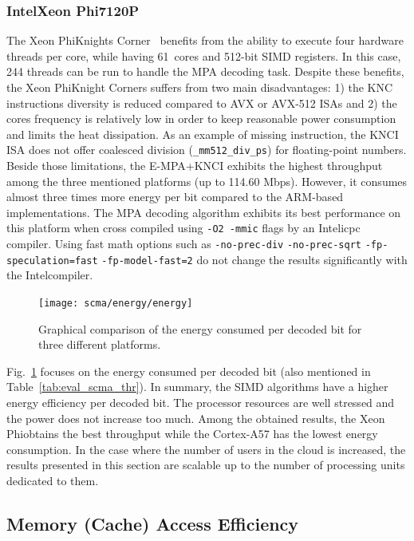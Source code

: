 \subsubsection{Intel\R Xeon Phi\TM 7120P}

The Xeon Phi\TM Knights Corner~\cite{Chrysos2012} benefits from the ability to
execute four hardware threads per core, while having 61~cores and 512-bit SIMD
registers. In this case, 244 threads can be run to handle the MPA decoding task.
Despite these benefits, the Xeon Phi\TM Knight Corners suffers from two main
disadvantages: 1) the KNC instructions diversity is reduced compared to AVX or
AVX-512 ISAs and 2) the cores frequency is relatively low in order to keep
reasonable power consumption and limits the heat dissipation. As an example of
missing instruction, the KNCI ISA does not offer coalesced division
(\verb|_mm512_div_ps|) for floating-point numbers. Beside those limitations,
the E-MPA+KNCI exhibits the highest throughput among the three mentioned
platforms (up to 114.60 Mbps). However, it consumes almost three times more
energy per bit compared to the ARM\R-based implementations. The MPA decoding
algorithm exhibits its best performance on this platform when cross compiled
using \verb|-O2 -mmic| flags by an Intel\R icpc compiler. Using fast math
options such as \verb|-no-prec-div| \verb|-no-prec-sqrt|
\verb|-fp-speculation=fast| \verb|-fp-model-fast=2| do not change the results
significantly with the Intel\R compiler.

\begin{figure}
  \centering
  \texttt{[image: scma/energy/energy]}
  \caption{Graphical comparison of the energy consumed per decoded bit for
           three different platforms.}
  \label{plot:eval_scma_energy}
\end{figure}

Fig.~\ref{plot:eval_scma_energy} focuses on the energy consumed per decoded bit
(also mentioned in Table~\ref{tab:eval_scma_thr}). In summary, the SIMD
algorithms have a higher energy efficiency per decoded bit. The processor
resources are well stressed and the power does not increase too much. Among the
obtained results, the Xeon Phi\TM obtains the best throughput while the
Cortex-A57 has the lowest energy consumption. In the case where the number of
users in the cloud is increased, the results presented in this section are
scalable up to the number of processing units dedicated to them.

\subsection{Memory (Cache) Access Efficiency}
\label{sec:eval_scma_memory}

